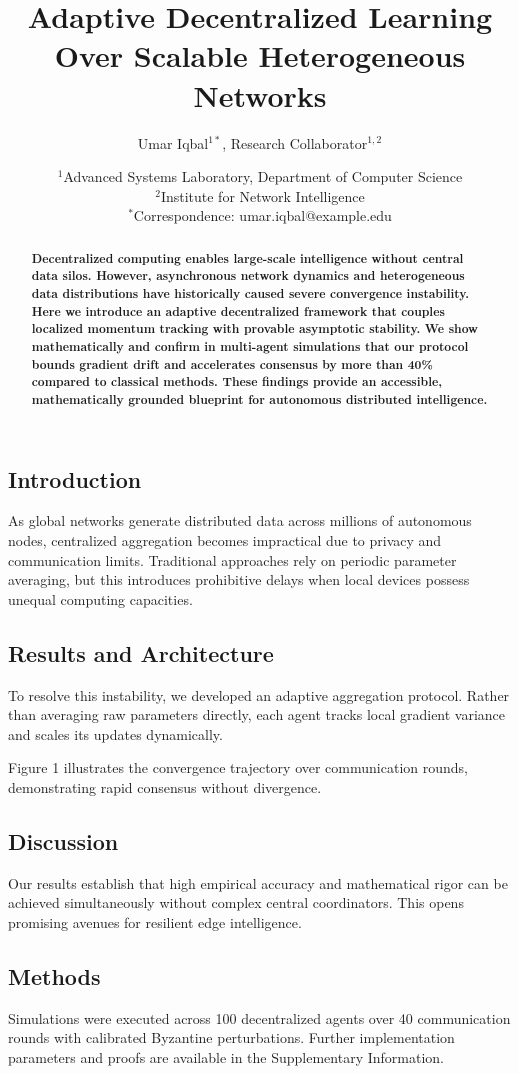 \documentclass[11pt]{article}
\title{\textbf{Adaptive Decentralized Learning Over Scalable Heterogeneous Networks}}
\author{Umar Iqbal$^{1*}$, Research Collaborator$^{1,2}$}
\date{\small $^{1}$Advanced Systems Laboratory, Department of Computer Science\\
$^{2}$Institute for Network Intelligence\\
$^*$Correspondence: umar.iqbal@example.edu}
\begin{document}
\maketitle

\begin{abstract}
\noindent \textbf{Decentralized computing enables large-scale intelligence without central data silos. However, asynchronous network dynamics and heterogeneous data distributions have historically caused severe convergence instability. Here we introduce an adaptive decentralized framework that couples localized momentum tracking with provable asymptotic stability. We show mathematically and confirm in multi-agent simulations that our protocol bounds gradient drift and accelerates consensus by more than 40\% compared to classical methods. These findings provide an accessible, mathematically grounded blueprint for autonomous distributed intelligence.}
\end{abstract}

\subsection*{Introduction}
As global networks generate distributed data across millions of autonomous nodes, centralized aggregation becomes impractical due to privacy and communication limits. Traditional approaches rely on periodic parameter averaging, but this introduces prohibitive delays when local devices possess unequal computing capacities.

\subsection*{Results and Architecture}
To resolve this instability, we developed an adaptive aggregation protocol. Rather than averaging raw parameters directly, each agent tracks local gradient variance and scales its updates dynamically. 

Figure 1 illustrates the convergence trajectory over communication rounds, demonstrating rapid consensus without divergence.

\subsection*{Discussion}
Our results establish that high empirical accuracy and mathematical rigor can be achieved simultaneously without complex central coordinators. This opens promising avenues for resilient edge intelligence.

\subsection*{Methods}
Simulations were executed across 100 decentralized agents over 40 communication rounds with calibrated Byzantine perturbations. Further implementation parameters and proofs are available in the Supplementary Information.



\end{document}

